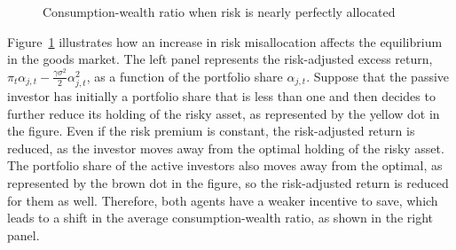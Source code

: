 \begin{figure}[t!]
\caption{Consumption-wealth ratio when risk is nearly perfectly allocated}    \label{fig:mkt_equilibrium_misallocation}
\end{figure}

Figure~\ref{fig:mkt_equilibrium_misallocation} illustrates how an increase in risk misallocation affects the equilibrium in the goods market. 
The left panel represents the risk-adjusted excess return, $\pi_t \alpha_{j,t} - \frac{\gamma \sigma^2}{2} \alpha_{j,t}^2$, as a function of the portfolio share $\alpha_{j,t}$. 
Suppose that the passive investor has initially a portfolio share that is less than one and then decides to further reduce its holding of the risky asset, as represented by the yellow dot in the figure. 
Even if the risk premium is constant, the risk-adjusted return is reduced, as the investor moves  away from the optimal holding of the risky asset. 
The portfolio share of the active investors also moves away from the optimal, as represented by the brown dot in the figure, so the risk-adjusted return is reduced for them as well. 
Therefore, both agents have a weaker incentive to save, which leads to a shift in the average consumption-wealth ratio, as shown in the right panel. 

